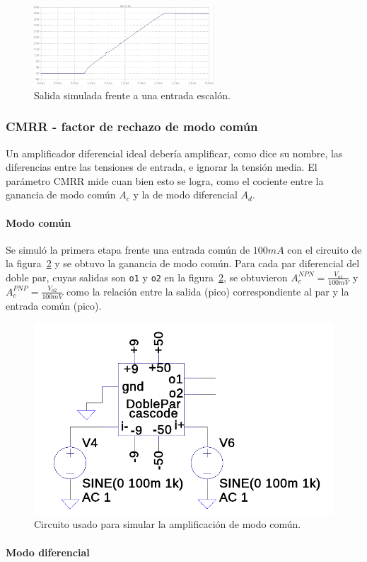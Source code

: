 \documentclass[a4paper,12pt,twoside]{article}
\begin{document}
\begin{figure}[H]
	\centering
	\includegraphics[width=0.6\textwidth]{img/sim/slew}
	\caption{Salida simulada frente a una entrada escalón.}
	\label{fig:slew}
\end{figure}

\subsubsection{CMRR - factor de rechazo de modo común}

Un amplificador diferencial ideal debería amplificar, como dice su nombre, las diferencias entre las tensiones de entrada, e ignorar la tensión media. El parámetro CMRR mide cuan bien esto se logra, como el cociente entre la ganancia de modo común $A_c$ y la de modo diferencial $A_d$. 

\paragraph{Modo común} Se simuló la primera etapa frente una entrada común de $100mA$ con el circuito de la figura~\ref{fig:ac} y se obtuvo la ganancia de modo común. Para cada par diferencial del doble par, cuyas salidas son \texttt{o1} y \texttt{o2} en la figura~\ref{fig:ac}, se obtuvieron $A_c^{NPN}=\frac{V_{o1}}{100mV}$ y $A_c^{PNP}=\frac{V_{o2}}{100mV}$ como la relación entre la salida (pico) correspondiente al par y la entrada común (pico). 


\begin{figure}[H]
	\centering
	\includegraphics[height=0.2\textwidth]{img/sim/ac}
	\caption{Circuito usado para simular la amplificación de modo común.}
	\label{fig:ac}
\end{figure}

\paragraph{Modo diferencial}
\end{document}
